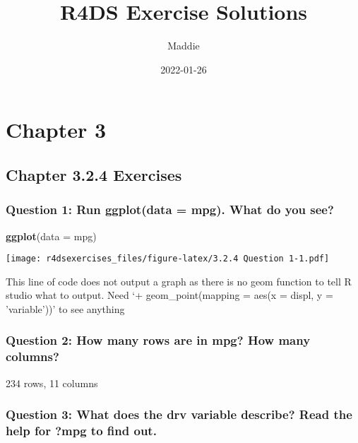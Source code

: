 \documentclass[
]{book}
\title{R4DS Exercise Solutions}
\author{Maddie}
\date{2022-01-26}
\newenvironment{Shaded}{\begin{snugshade}}{\end{snugshade}}
\newcommand{\DataTypeTok}[1]{\textcolor[rgb]{0.13,0.29,0.53}{#1}}
\newcommand{\KeywordTok}[1]{\textcolor[rgb]{0.13,0.29,0.53}{\textbf{#1}}}
\newcommand{\NormalTok}[1]{#1}
\begin{document}
\maketitle

{
\setcounter{tocdepth}{1}
\tableofcontents
}
\hypertarget{chapter-3}{%
\chapter{Chapter 3}\label{chapter-3}}

\hypertarget{chapter-3.2.4-exercises}{%
\section{Chapter 3.2.4 Exercises}\label{chapter-3.2.4-exercises}}

\hypertarget{question-1-run-ggplotdata-mpg.-what-do-you-see}{%
\subsection{Question 1: Run ggplot(data = mpg). What do you see?}\label{question-1-run-ggplotdata-mpg.-what-do-you-see}}

\begin{Shaded}
\begin{Highlighting}[]
\KeywordTok{ggplot}\NormalTok{(}\DataTypeTok{data =}\NormalTok{ mpg) }
\end{Highlighting}
\end{Shaded}

\texttt{[image: r4dsexercises\_files/figure-latex/3.2.4 Question 1-1.pdf]}

This line of code does not output a graph as there is no geom function to tell R studio what to output. Need `+ geom\_point(mapping = aes(x = displ, y = 'variable'))' to see anything

\hypertarget{question-2-how-many-rows-are-in-mpg-how-many-columns}{%
\subsection{Question 2: How many rows are in mpg? How many columns?}\label{question-2-how-many-rows-are-in-mpg-how-many-columns}}

234 rows, 11 columns

\hypertarget{question-3-what-does-the-drv-variable-describe-read-the-help-for-mpg-to-find-out.}{%
\subsection{Question 3: What does the drv variable describe? Read the help for ?mpg to find out.}\label{question-3-what-does-the-drv-variable-describe-read-the-help-for-mpg-to-find-out.}}
\end{document}
